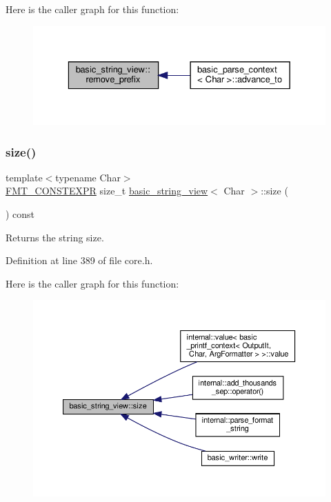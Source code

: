 Here is the caller graph for this function\+:
\nopagebreak
\begin{figure}[H]
\begin{center}
\leavevmode
\includegraphics[width=329pt]{classbasic__string__view_a1da7aa04f8f729b4f846e573cecba499_icgraph}
\end{center}
\end{figure}
\mbox{\label{classbasic__string__view_a7fd9f4dcac1782259b0cd217af69d737}} 
\subsubsection{\texorpdfstring{size()}{size()}}
{\footnotesize\ttfamily template$<$typename Char$>$ \\
\hyperlink{core_8h_a69201cb276383873487bf68b4ef8b4cd}{F\+M\+T\+\_\+\+C\+O\+N\+S\+T\+E\+X\+PR} size\+\_\+t \hyperlink{classbasic__string__view}{basic\+\_\+string\+\_\+view}$<$ Char $>$\+::size (\begin{DoxyParamCaption}{ }\end{DoxyParamCaption}) const\hspace{0.3cm}{\ttfamily [inline]}}

Returns the string size. 

Definition at line 389 of file core.\+h.

Here is the caller graph for this function\+:
\nopagebreak
\begin{figure}[H]
\begin{center}
\leavevmode
\includegraphics[width=350pt]{classbasic__string__view_a7fd9f4dcac1782259b0cd217af69d737_icgraph}
\end{center}
\end{figure}


